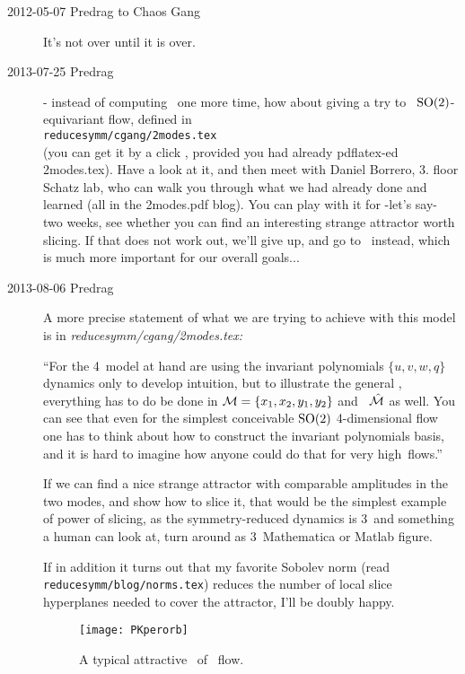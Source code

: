 \begin{description}
\item[2012-05-07  Predrag to Chaos Gang] It's not over until it is over.

\item[2013-07-25  Predrag]
 - instead of computing \cLf\ one more
time, how about giving a try to \twomode\ $\textrm{SO}(2)$-equivariant flow,
defined in
\\
\texttt{reducesymm/cgang/2modes.tex}
\\ (you can get it by a click
, provided you had already pdflatex-ed
2modes.tex). Have a look at it, and then meet with Daniel Borrero, 3. floor
Schatz lab, who can walk you through what we had already done and learned
(all in the 2modes.pdf blog). You can play with it for -let's say- two
weeks, see whether you can find an interesting strange attractor worth
slicing. If that does not work out, we'll give up, and go to \KS\ instead,
which is much more important for our overall goals...

\item[2013-08-06 Predrag]
A more precise statement of what we are trying to achieve with this model is
in \emph{reducesymm/cgang/2modes.tex:}

``For the 4\dmn\ model at hand are using the invariant polynomials
$\{u,v,w,q\}$ dynamics only to develop intuition, but to illustrate the
general \mslices, everything has to do be done in ${\cal M} =
\{x_1,x_2,y_1,y_2\}$ and \slice\ $\hat{\cal M}$ as well. You can see that even
for the simplest conceivable $\textrm{SO}(2)$ 4-dimensional flow one has to
think about how to construct the invariant polynomials basis, and it is
hard to imagine how anyone could do that for very high\dmn\ flows.''

If we can find a nice strange attractor with comparable amplitudes in the
two modes, and show how to slice it, that would be the simplest example of
power of slicing, as the symmetry-reduced dynamics is 3\dmn\ and something
a human can look at, turn around as 3\dmn\ Mathematica or Matlab figure.

If in addition it turns out that my favorite Sobolev norm (read
\texttt{reducesymm/blog/norms.tex}) reduces the number of local slice
hyperplanes needed to cover the attractor, I'll be doubly happy.

\begin{figure}[ht]
\begin{center}
\texttt{[image: PKperorb]}
\end{center}
\caption{A typical
attractive \reqv\  of \twomode\ flow.}
\label{fig:PKperorb}
\end{figure}


\end{description}
